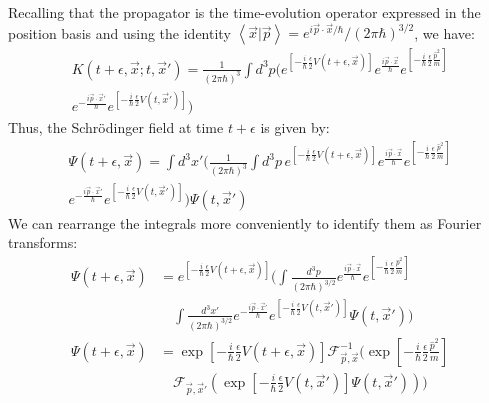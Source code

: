 \documentclass[12pt]{article}
\newcommand{\braket}[2]{\left< #1 | #2 \right>}
\begin{document}
Recalling that the propagator is the time-evolution operator expressed in the position basis and using the identity $\braket{\vec{x}}{\vec{p}}=e^{i\vec{p}\cdot \vec{x}/\hbar}/(2\pi \hbar)^{3/2}$, we have:
\begin{multline}
    K(t+\epsilon,\vec{x};t,\vec{x}')=\frac{1}{(2\pi \hbar)^3}\int d^3 p \bigg( e^{\left[-\frac{i}{\hbar} \frac{\epsilon}{2} V(t+\epsilon,\vec{x}) \right]} e^{\frac{i\vec{p}\cdot \vec{x}}{\hbar}}e^{\left[-\frac{i}{\hbar}\frac{\epsilon}{2}\frac{\hat{p}^2}{m}  \right]} \\ e^{-\frac{i\vec{p}\cdot \vec{x}'}{\hbar}}e^{\left[ -\frac{i}{\hbar}\frac{\epsilon}{2}V(t,\vec{x}')\right]} \bigg)
\end{multline}
Thus, the Schrödinger field at time $t+\epsilon$ is given by:
\begin{multline}
\label{eqn:psiTE}
\Psi(t+\epsilon,\vec{x})=\int d^{3}x' \bigg( \frac{1}{(2\pi \hbar)^3}\int d^3 p \, e^{\left[-\frac{i}{\hbar} \frac{\epsilon}{2} V(t+\epsilon,\vec{x}) \right]} e^{\frac{i\vec{p}\cdot \vec{x}}{\hbar}}e^{\left[-\frac{i}{\hbar}\frac{\epsilon}{2}\frac{\hat{p}^2}{m}  \right]} \\ e^{-\frac{i\vec{p}\cdot \vec{x}'}{\hbar}}e^{\left[ -\frac{i}{\hbar}\frac{\epsilon}{2}V(t,\vec{x}')\right]} \bigg) \Psi(t,\vec{x}')
\end{multline}
We can rearrange the integrals more conveniently to identify them as Fourier transforms:
\begin{align}
    \Psi(t+\epsilon,\vec{x}) &= e^{\left[-\frac{i}{\hbar} \frac{\epsilon}{2} V(t+\epsilon,\vec{x}) \right]} 
    \bigg(\int \frac{d^{3}p}{(2 \pi \hbar)^{3/2}}e^{\frac{i\vec{p}\cdot \vec{x}}{\hbar}}e^{\left[-\frac{i}{\hbar}\frac{\epsilon}{2}\frac{\hat{p}^2}{m}  \right]} \nonumber \\
    &\quad \int \frac{d^{3}x'}{(2\pi \hbar)^{3/2}}e^{-\frac{i\vec{p}\cdot \vec{x}'}{\hbar}}e^{\left[ -\frac{i}{\hbar}\frac{\epsilon}{2}V(t,\vec{x}')\right]} \Psi(t,\vec{x}') \bigg) \\
    \Psi(t+\epsilon,\vec{x}) &= \exp\left[-\frac{i}{\hbar}\frac{\epsilon}{2}V(t+\epsilon,\vec{x}) \right] 
    \mathcal{F}^{-1}_{\vec{p},\vec{x}}\bigg(\exp\left[-\frac{i}{\hbar}\frac{\epsilon}{2}\frac{\hat{p}^2}{m} \right] \nonumber \\
    &\quad \mathcal{F}_{\vec{p},\vec{x}'} \left( \exp\left[-\frac{i}{\hbar}\frac{\epsilon}{2}V(t,\vec{x}') \right] \Psi(t,\vec{x}') \right) \bigg)
\end{align}
\end{document}
